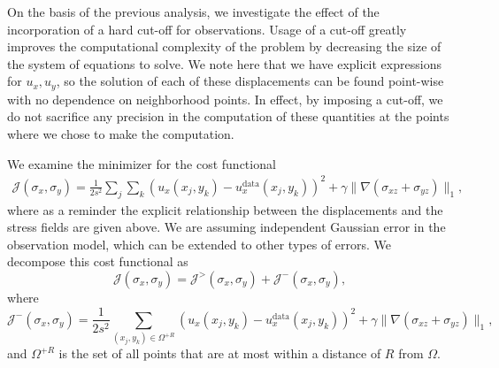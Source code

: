 \documentclass{article}
\begin{document}
On the basis of the previous analysis, we investigate the effect of the incorporation of a hard cut-off for observations. Usage of a cut-off greatly improves the computational complexity of the problem by decreasing the size of the system of equations to solve. We note here that we have explicit expressions for $u_x,u_y$, so the solution of each of these displacements can be found point-wise with no dependence on neighborhood points. In effect, by imposing a cut-off, we do not sacrifice any precision in the computation of these quantities at the points where we chose to make the computation.

We examine the minimizer for the cost functional
\begin{align}
\mathcal{J}(\sigma_x,\sigma_y) = \frac{1}{2s^2}\sum_j\sum_k \left(u_x(x_j,y_k) - u^{\textrm{data}}_x(x_j,y_k)\right)^2 +  \gamma \| \nabla (\sigma_{xz} + \sigma_{yz}) \|_1,
\end{align}
where as a reminder the explicit relationship between the displacements and the stress fields are given above. We are assuming independent Gaussian error in the observation model, which can be extended to other types of errors. We decompose this cost functional as
\begin{equation}
\mathcal{J}(\sigma_x,\sigma_y) = \mathcal{J}^{>}(\sigma_x,\sigma_y) + \mathcal{J}^{-}(\sigma_x,\sigma_y), 
\end{equation}
where 
\begin{equation}
 \mathcal{J}^{-}(\sigma_x,\sigma_y)=  \frac{1}{2s^2}\sum_{(x_j,y_k)\in\Omega^{+R}} \left(u_x(x_j,y_k) - u^{\textrm{data}}_x(x_j,y_k)\right)^2 +  \gamma \| \nabla (\sigma_{xz} + \sigma_{yz}) \|_1 , 
\end{equation}
and $\Omega^{+R}$ is the set of all points that are at most within a distance of $R$ from $\Omega$.
\end{document}
